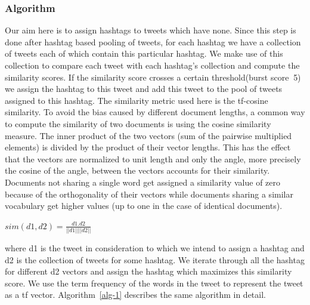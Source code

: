 \documentclass[10pt,a5paper,twoside]{article}
\begin{document}
\subsubsection{Algorithm}
Our aim here is to assign hashtags to tweets which have none. Since this step is done after hashtag based pooling of tweets, for each hashtag we have a collection of tweets each of which contain this particular hashtag. We make use of this collection to compare each tweet with each hashtag's collection and compute the similarity scores. If the similarity score crosses a certain threshold(burst score $\>$5) we assign the hashtag to this tweet and add this tweet to the pool of tweets assigned to this hashtag. The similarity metric used here is the tf-cosine similarity. To avoid the bias caused by different document lengths, a common way to compute the similarity of two documents is using the cosine similarity measure. The inner product of the two vectors (sum of the pairwise multiplied elements) is divided by the product of their vector lengths. This has the effect that the vectors are normalized to unit length and only the angle, more precisely the cosine of the angle, between the vectors accounts for their similarity. Documents not sharing a single word get assigned a similarity value of zero because of the orthogonality of their vectors while documents sharing a similar vocabulary get higher values (up to one in the case of identical documents).

\begin{center}
$sim(d1,d2) = \frac{d1 . d2}{||d1|| ||d2||}$
\end{center}

where d1 is the tweet in consideration to which we intend to assign a hashtag and d2 is the collection of tweets for some hashtag. We iterate through all the hashtag for different d2 vectors and assign the hashtag which maximizes this similarity score. We use the term frequency of the words in the tweet to represent the tweet as a tf vector. Algorithm~\ref{alg-1} describes the same algorithm in detail.

\end{document}

